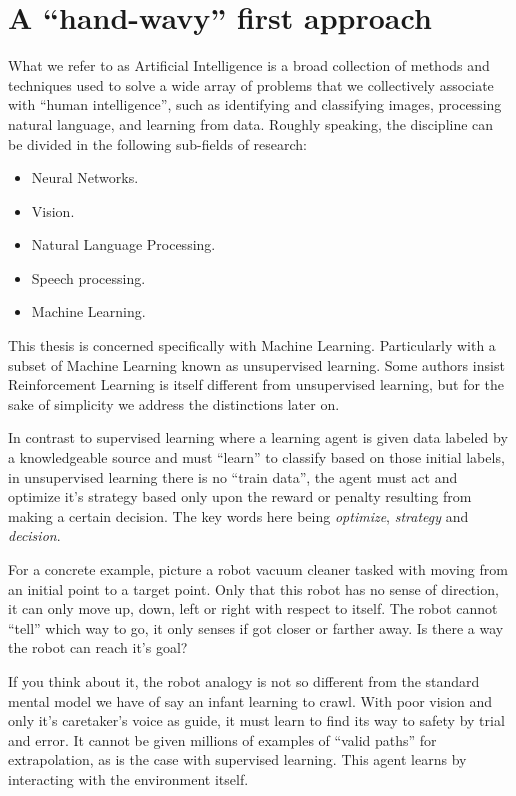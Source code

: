 \section{A ``hand-wavy'' first approach}

What we refer to as Artificial Intelligence is a broad 
collection of methods and techniques used to solve a wide array 
of problems that we collectively associate with ``human 
intelligence'', such as identifying and classifying images, 
processing natural language, and learning from data.  Roughly 
speaking, the discipline can be divided in the following 
sub-fields of research:

\begin{itemize}
	\item Neural Networks.
	\item Vision.
	\item Natural Language Processing.
	\item Speech processing.
	\item Machine Learning.
\end{itemize}

This thesis is concerned specifically with Machine Learning.  
Particularly with a subset of Machine Learning known as 
unsupervised learning.  Some authors \cite{SuttonBarto} insist 
Reinforcement Learning is itself different from unsupervised 
learning, but for the sake of simplicity we address the 
distinctions later on.

In contrast to supervised learning where a learning agent is 
given data labeled by a knowledgeable source and must ``learn'' 
to classify based on those initial labels, in unsupervised 
learning there is no ``train data'', the agent must act and 
optimize it's strategy based only upon the reward or penalty 
resulting from making a certain decision.  The key words here 
being \textit{optimize}, \textit{strategy} and 
\textit{decision}.

For a concrete example, picture a robot vacuum cleaner tasked 
with moving from an initial point to a target point.  Only that 
this robot has no sense of direction, it can only move up, down, 
left or right with respect to itself. The robot cannot ``tell'' 
which way to go, it only senses if got closer or farther away. 
Is there a way the robot can reach it's goal?

If you think about it, the robot analogy is not so different 
from the standard mental model we have of say an infant learning 
to crawl.  With poor vision and only it's caretaker's voice as 
guide, it must learn to find its way to safety by trial and 
error. It cannot be given millions of examples of ``valid 
paths'' for extrapolation, as is the case with supervised 
learning. This agent learns by interacting with the environment 
itself.

